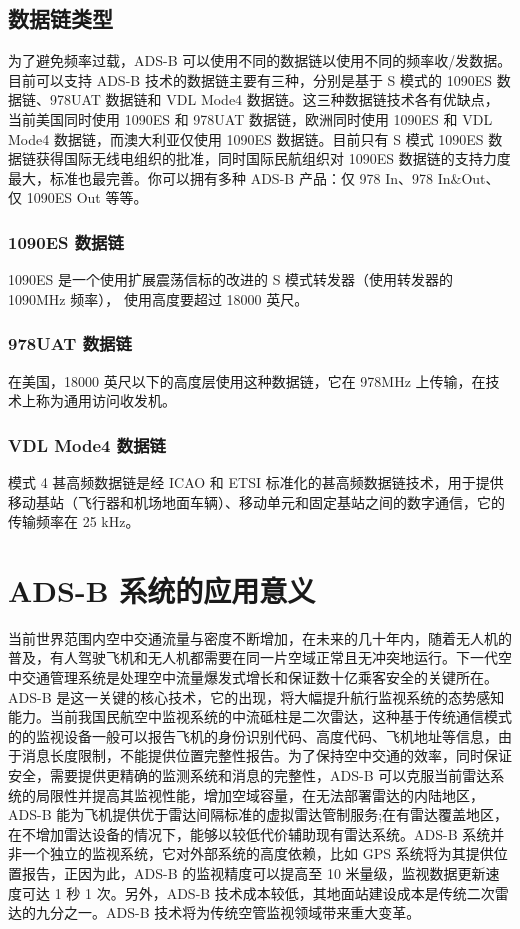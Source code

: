 \subsection{数据链类型}

为了避免频率过载，ADS-B 可以使用不同的数据链以使用不同的频率收/发数据。目前可以支持 ADS-B 技术的数据链主要有三种，分别是基于 S 模式的 \acs{1090ES} 数据链、\acs{978UAT} 数据链和 \acs{VDL Mode4} 数据链。这三种数据链技术各有优缺点，当前美国同时使用 1090ES 和 978UAT 数据链，欧洲同时使用 1090ES 和 VDL Mode4 数据链，而澳大利亚仅使用 1090ES 数据链。目前只有 S 模式 1090ES 数据链获得国际无线电组织的批准，同时国际民航组织对 1090ES 数据链的支持力度最大，标准也最完善。你可以拥有多种 ADS-B 产品：仅 978 In、978 In\&Out、仅 1090ES Out 等等。

\subsubsection{1090ES 数据链}

1090ES 是一个使用扩展震荡信标的改进的 S 模式转发器（使用转发器的 1090MHz 频率），
使用高度要超过 18000 英尺。

\subsubsection{978UAT 数据链}

在美国，18000 英尺以下的高度层使用这种数据链，它在 978MHz 上传输，在技术上称为通用访问收发机。

\subsubsection{VDL Mode4 数据链}

模式 4 甚高频数据链是经 \acs{ICAO} 和 \acs{ETSI} 标准化的甚高频数据链技术，用于提供移动基站（飞行器和机场地面车辆）、移动单元和固定基站之间的数字通信，它的传输频率在 25 kHz。

\section{ADS-B 系统的应用意义}

当前世界范围内空中交通流量与密度不断增加，在未来的几十年内，随着无人机的普及，有人驾驶飞机和无人机都需要在同一片空域正常且无冲突地运行。下一代空中交通管理系统是处理空中流量爆发式增长和保证数十亿乘客安全的关键所在。ADS-B 是这一关键的核心技术，它的出现，将大幅提升航行监视系统的态势感知能力。当前我国民航空中监视系统的中流砥柱是二次雷达，这种基于传统通信模式的的监视设备一般可以报告飞机的身份识别代码、高度代码、飞机地址等信息，由于消息长度限制，不能提供位置完整性报告。为了保持空中交通的效率，同时保证安全，需要提供更精确的监测系统和消息的完整性，ADS-B 可以克服当前雷达系统的局限性并提高其监视性能，增加空域容量，在无法部署雷达的内陆地区，ADS-B 能为飞机提供优于雷达间隔标准的虚拟雷达管制服务;在有雷达覆盖地区，在不增加雷达设备的情况下，能够以较低代价辅助现有雷达系统。ADS-B 系统并非一个独立的监视系统，它对外部系统的高度依赖，比如 \acs{GPS} 系统将为其提供位置报告，正因为此，ADS-B 的监视精度可以提高至 10 米量级，监视数据更新速度可达 1 秒 1 次。另外，ADS-B 技术成本较低，其地面站建设成本是传统二次雷达的九分之一。ADS-B 技术将为传统空管监视领域带来重大变革。

